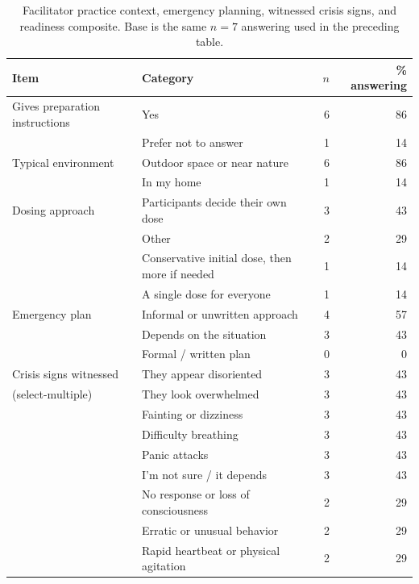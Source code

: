 \documentclass[12pt]{article}
\begin{document}
\begin{table}[htbp]
\centering
\caption{Facilitator practice context, emergency planning, witnessed crisis signs, and readiness composite.
Base is the same $n=7$ answering used in the preceding table.}
\begin{tabular}{p{4.6cm}p{5.4cm}rr}
\toprule
Item & Category & $n$ & \% answering \\
\midrule
Gives preparation instructions & Yes & 6 & 86 \\
                             & Prefer not to answer & 1 & 14 \\
\addlinespace
Typical environment          & Outdoor space or near nature & 6 & 86 \\
                             & In my home & 1 & 14 \\
\addlinespace
Dosing approach              & Participants decide their own dose & 3 & 43 \\
                             & Other & 2 & 29 \\
                             & Conservative initial dose, then more if needed & 1 & 14 \\
                             & A single dose for everyone & 1 & 14 \\
\addlinespace
Emergency plan               & Informal or unwritten approach & 4 & 57 \\
                             & Depends on the situation & 3 & 43 \\
                             & Formal / written plan & 0 & 0 \\
\addlinespace
Crisis signs witnessed       & They appear disoriented & 3 & 43 \\
(select-multiple)            & They look overwhelmed & 3 & 43 \\
                             & Fainting or dizziness & 3 & 43 \\
                             & Difficulty breathing & 3 & 43 \\
                             & Panic attacks & 3 & 43 \\
                             & I'm not sure / it depends & 3 & 43 \\
                             & No response or loss of consciousness & 2 & 29 \\
                             & Erratic or unusual behavior & 2 & 29 \\
                             & Rapid heartbeat or physical agitation & 2 & 29 \\

\end{tabular}
\end{table}
\end{document}
